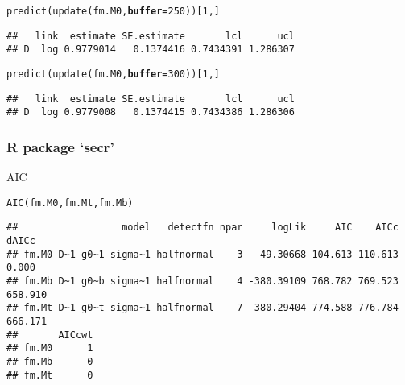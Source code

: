 \documentclass[color=usenames,dvipsnames]{beamer}\usepackage[]{graphicx}\usepackage[]{color}
\makeatletter
\newcommand{\hlnum}[1]{\textcolor[rgb]{0.69,0.494,0}{#1}}%
\newcommand{\hlstd}[1]{\textcolor[rgb]{0,0,0}{#1}}%
\newcommand{\hlkwc}[1]{\textcolor[rgb]{0,0,0}{\textbf{#1}}}%
\newcommand{\hlkwd}[1]{\textcolor[rgb]{0.004,0.004,0.506}{#1}}%
\newenvironment{kframe}{%
 \def\at@end@of@kframe{}%
 \ifinner\ifhmode%
  \def\at@end@of@kframe{\end{minipage}}%
  \begin{minipage}{\columnwidth}%
 \fi\fi%
 \def\FrameCommand##1{\hskip\@totalleftmargin \hskip-\fboxsep
 \colorbox{shadecolor}{##1}\hskip-\fboxsep
     \hskip-\linewidth \hskip-\@totalleftmargin \hskip\columnwidth}%
 \MakeFramed {\advance\hsize-\width
   \@totalleftmargin\z@ \linewidth\hsize
   \@setminipage}}%
 {\par\unskip\endMakeFramed%
 \at@end@of@kframe}
\newenvironment{knitrout}{}{} %
\makeatother
\begin{document}
\begin{frame}[fragile]
\begin{knitrout}
\begin{kframe}
\begin{alltt}
\hlkwd{predict}\hlstd{(}\hlkwd{update}\hlstd{(fm.M0,} \hlkwc{buffer}\hlstd{=}\hlnum{250}\hlstd{))[}\hlnum{1}\hlstd{,]}
\end{alltt}
\begin{verbatim}
##   link  estimate SE.estimate       lcl      ucl
## D  log 0.9779014   0.1374416 0.7434391 1.286307
\end{verbatim}
\end{kframe}
\end{knitrout}
\pause
\vspace{-12pt}
\begin{knitrout}\scriptsize
{}\color{fgcolor}\begin{kframe}
\begin{alltt}
\hlkwd{predict}\hlstd{(}\hlkwd{update}\hlstd{(fm.M0,} \hlkwc{buffer}\hlstd{=}\hlnum{300}\hlstd{))[}\hlnum{1}\hlstd{,]}
\end{alltt}
\begin{verbatim}
##   link  estimate SE.estimate       lcl      ucl
## D  log 0.9779008   0.1374415 0.7434386 1.286306
\end{verbatim}
\end{kframe}
\end{knitrout}
\end{frame}



\begin{frame}[fragile]
  \frametitle{R package `secr'}
  AIC
\begin{knitrout}\tiny
{}\color{fgcolor}\begin{kframe}
\begin{alltt}
\hlkwd{AIC}\hlstd{(fm.M0, fm.Mt, fm.Mb)}
\end{alltt}


{\ttfamily\noindent\color{warningcolor}{\#\# Warning in AIC.secr(fm.M0, fm.Mt, fm.Mb): models not compatible for AIC}}\begin{verbatim}
##                  model   detectfn npar     logLik     AIC    AICc   dAICc
## fm.M0 D~1 g0~1 sigma~1 halfnormal    3  -49.30668 104.613 110.613   0.000
## fm.Mb D~1 g0~b sigma~1 halfnormal    4 -380.39109 768.782 769.523 658.910
## fm.Mt D~1 g0~t sigma~1 halfnormal    7 -380.29404 774.588 776.784 666.171
##       AICcwt
## fm.M0      1
## fm.Mb      0
## fm.Mt      0
\end{verbatim}
\end{kframe}
\end{knitrout}
\end{frame}
\end{document}
